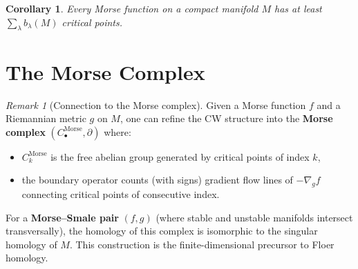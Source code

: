\documentclass[12pt,a4paper,openany]{book}
\newtheorem{corollary}[theorem]{Corollary}
\theoremstyle{definition}
\theoremstyle{remark}
\newtheorem{remark}[theorem]{Remark}
\begin{document}
\begin{corollary}\label{cor:morse-lower-bound}
Every Morse function on a compact manifold $M$ has at least
$\sum_\lambda b_\lambda(M)$ critical points.
\end{corollary}

\section{The Morse Complex}\label{sec:morse-complex}

\begin{remark}[Connection to the Morse complex]\label{rem:morse-complex}
Given a Morse function $f$ and a Riemannian metric $g$ on $M$,
one can refine the CW structure into the \textbf{Morse complex}
$(C_\bullet^{\mathrm{Morse}},\partial)$ where:
\begin{itemize}
  \item $C_k^{\mathrm{Morse}}$ is the free abelian group generated by
    critical points of index $k$,
  \item the boundary operator counts (with signs) gradient flow lines
    of $-\nabla_g f$ connecting critical points of consecutive index.
\end{itemize}
For a \textbf{Morse--Smale pair} $(f,g)$
(where stable and unstable manifolds intersect transversally),
the homology of this complex is isomorphic to the singular homology of $M$.
This construction is the finite-dimensional precursor to Floer homology.
\end{remark}
\end{document}
